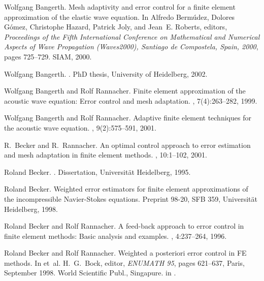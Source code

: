 \documentclass{article}
\begin{document}
\begin{thebibliography}{10}

Wolfgang Bangerth.
\newblock Mesh adaptivity and error control for a finite element approximation
  of the elastic wave equation.
\newblock In Alfredo Berm\'udez, Dolores G\'omez, Christophe Hazard, Patrick
  Joly, and Jean~E. Roberts, editors, {\em Proceedings of the Fifth
  International Conference on Mathematical and Numerical Aspects of Wave
  Propagation (Waves2000), Santiago de Compostela, Spain, 2000}, pages
  725--729. SIAM, 2000.

Wolfgang Bangerth.
.
\newblock PhD thesis, University of Heidelberg, 2002.

Wolfgang Bangerth and Rolf Rannacher.
\newblock Finite element approximation of the acoustic wave equation: {E}rror
  control and mesh adaptation.
, 7(4):263--282, 1999.

Wolfgang Bangerth and Rolf Rannacher.
\newblock Adaptive finite element techniques for the acoustic wave equation.
, 9(2):575--591, 2001.

R.~Becker and R.~Rannacher.
\newblock An optimal control approach to error estimation and mesh adaptation
  in finite element methods.
, 10:1--102, 2001.

Roland Becker.
.
\newblock Dissertation, Universit{\"a}t Heidelberg, 1995.

Roland Becker.
\newblock Weighted error estimators for finite element approximations of the
  incompressible {N}avier-{S}tokes equations.
\newblock Preprint 98-20, SFB 359, Universit{\"a}t Heidelberg, 1998.

Roland Becker and Rolf Rannacher.
\newblock A feed-back approach to error control in finite element methods:
  {B}asic analysis and examples.
, 4:237--264, 1996.

Roland Becker and Rolf Rannacher.
\newblock Weighted a posteriori error control in {FE} methods.
\newblock In et~al. H.~G.~Bock, editor, {\em ENUMATH 95}, pages 621--637,
  Paris, September 1998. World Scientific Publ., Singapure.
\newblock in \cite{enumath97}.


\end{thebibliography}
\end{document}
